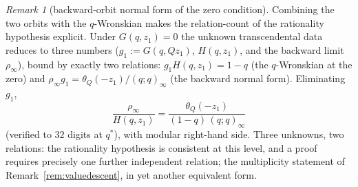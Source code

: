 \documentclass[11pt]{article}
\theoremstyle{plain}
\theoremstyle{definition}
\theoremstyle{remark}
\newtheorem{remark}[theorem]{Remark}
\begin{document}
\begin{remark}[backward-orbit normal form of the zero condition]
Combining the two orbits with the $q$-Wronskian makes the relation-count of the rationality
hypothesis explicit. Under $G(q,z_1)=0$ the unknown transcendental data reduces to three numbers ($g_1:=G(q,Qz_1)$, $H(q,z_1)$, and the backward limit $\rho_\infty$), bound by exactly two
relations: $g_1H(q,z_1)=1-q$ (the $q$-Wronskian at the zero) and
$\rho_\infty g_1=\theta_Q(-z_1)/(q;q)_\infty$ (the backward normal form). Eliminating $g_1$,
\[
   \frac{\rho_\infty}{H(q,z_1)}=\frac{\theta_Q(-z_1)}{(1-q)\,(q;q)_\infty}
\]
(verified to $32$ digits at $q^\ast$), with modular right-hand side. Three unknowns, two relations:
the rationality hypothesis is consistent at this level, and a proof requires precisely one further
independent relation; the multiplicity statement of Remark~\ref{rem:valuedescent}, in yet another
equivalent form.
\end{remark}
\end{document}
